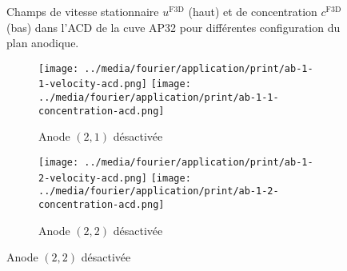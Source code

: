 \begin{figure}[h]
\begin{center}
    \caption{Champs de vitesse stationnaire $u^{\mathrm{F3D}}$ (haut) et de
      concentration $c^\mathrm{F3D}$ (bas) dans l'ACD de la cuve
      AP32 pour différentes configuration du plan anodique.}
    \label{fig:f3d-deactivated}
  \end{center}
\end{figure}

\begin{figure}[h]
  \begin{center}
    \begin{subfigure}[t]{\textwidth}
      \begin{center}
        \texttt{[image: ../media/fourier/application/print/ab-1-1-velocity-acd.png]}
        \texttt{[image: ../media/fourier/application/print/ab-1-1-concentration-acd.png]}
        \caption{Anode $(2,1)$ désactivée}
      \end{center}
    \end{subfigure}
    \begin{subfigure}[t]{\textwidth}
      \begin{center}
        \texttt{[image: ../media/fourier/application/print/ab-1-2-velocity-acd.png]}
        \texttt{[image: ../media/fourier/application/print/ab-1-2-concentration-acd.png]}
        \caption{Anode $(2,2)$ désactivée}
      \end{center}
    \end{subfigure}


\end{center}
\end{figure}
